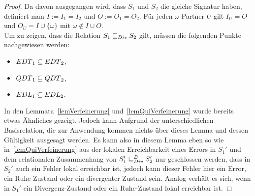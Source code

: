 \begin{proof}
  Da davon ausgegangen wird, dass $S_1$ und $S_2$ die gleiche Signatur haben,
  definiert man $I:=I_1=I_2$ und $O:=O_1=O_2$. Für jeden $\omega$-Partner $U$
  gilt $I_U=O$ und $O_U=I\cup\{\omega\}$ mit $\omega\notin I\cup O$.\\
  Um zu zeigen, dass die Relation $S_1\sqsubseteq _{Div} S_2$ gilt, müssen die folgenden
  Punkte nachgewiesen werden:
  \begin{itemize}
    \item $EDT{}_1\subseteq EDT{}_2$,
    \item $QDT{}_1\subseteq QDT{}_2$,
    \item $EDL{}_1\subseteq EDL{}_2$.
  \end{itemize}
  In den Lemmata~\ref{lemVerfeinerung} und~\ref{lemQuiVerfeinerung} wurde
  bereits etwas Ähnliches gezeigt. Jedoch kann Aufgrund der unterschiedlichen
  Basisrelation, die zur Anwendung kommen nichts über dieses Lemma und dessen
  Gültigkeit ausgesagt werden. Es kann also in diesem Lemma eben so wie
  in~\ref{lemQuiVerfeinerung} aus der lokalen Erreichbarkeit eines Errors in
  $S_1'$ und dem relationalen Zusammenhang von $S_1'\sqsubseteq _{Div}^B S_2'$ nur
  geschlossen werden, dass in $S_2'$ auch ein Fehler lokal erreichbar ist,
  jedoch kann dieser Fehler hier ein Error, ein Ruhe-Zustand oder ein
  divergenter Zustand sein. Analog verhält es sich, wenn in $S_1'$ ein
  Divergenz-Zustand oder ein Ruhe-Zustand lokal erreichbar ist.


\end{proof}
